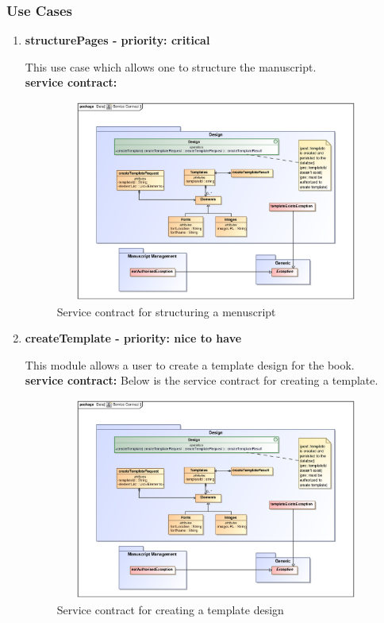 \documentclass[12pt]{article}
\begin{document}
\subsubsection{Use Cases}
\begin{enumerate}
\item \textbf{structurePages - priority: critical}\\
\par{This use case which allows one to structure the  manuscript.}\\
\textbf{service contract:}

 \begin{figure}[h]
\includegraphics[height=250px, width=500px]{epsImages/Design/createTemplateServiceContract.eps}
\caption{Service contract for structuring a menuscript}
\end{figure}

\item \textbf{createTemplate - priority: nice to have}\\
\par{This module allows a user to create a template design for the book.}\\
\textbf{service contract:} Below is the service contract for creating a template.

 \begin{figure}[h]
\includegraphics[height=250px, width=500px]{epsImages/Design/createTemplateServiceContract.eps}
\caption{Service contract for creating a template design}
\end{figure}


\end{enumerate}
\end{document}
